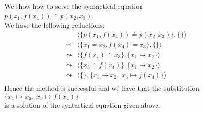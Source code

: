 \exampleEng
We show how to solve the syntactical equation \\[0.2cm]
\hspace*{1.3cm}  $p(x_1, f(x_4)) \doteq p( x_2, x_3)$.  \\[0.2cm]
We have the following reductions:
$$
\begin{array}{ll}
          &  \big\langle \big\{ p(x_1, f(x_4)) \doteq p( x_2, x_3) \big\}, \{ \} \big\rangle \\[0.2cm]
 \leadsto &  \big\langle \big\{ x_1 \doteq x_2, f(x_4) \doteq x_3 \big\}, \{ \} \big\rangle \\[0.2cm]
 \leadsto &  \big\langle \big\{ f(x_4) \doteq x_3 \big\}, \{ x_1 \mapsto x_2 \} \big\rangle \\[0.2cm]
 \leadsto &  \big\langle \big\{ x_3 \doteq f(x_4) \big\}, \{ x_1 \mapsto x_2 \} \big\rangle \\[0.2cm]
 \leadsto &  \big\langle \big\{\big\}, \{ x_1 \mapsto x_2,\; x_3 \mapsto f(x_4) \} \big\rangle \\[0.2cm]
\end{array}
$$
Hence the method is successful and we have that the substitution
\\[0.2cm]
\hspace*{1.3cm}
$\{ x_1 \mapsto x_2,\; x_3 \mapsto f(x_4) \}$ \\[0.2cm]
is a solution of the syntactical equation given above.  \eox

